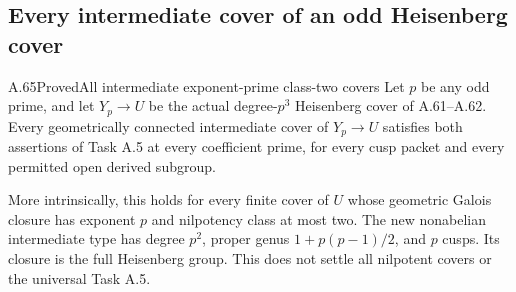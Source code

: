 \subsection{Every intermediate cover of an odd Heisenberg cover}

\begin{statement}{A.65}{Proved}{All intermediate exponent-prime class-two covers}
Let \(p\) be any odd prime, and let
\(Y_p\to U\) be the actual degree-\(p^3\)
Heisenberg cover of A.61--A.62. Every geometrically
connected intermediate cover of \(Y_p\to U\)
satisfies both assertions of Task A.5 at every
coefficient prime, for every cusp packet and every
permitted open derived subgroup.

More intrinsically, this holds for every finite cover
of \(U\) whose geometric Galois closure has exponent
\(p\) and nilpotency class at most two. The new
nonabelian intermediate type has degree \(p^2\),
proper genus \(1+p(p-1)/2\), and \(p\) cusps.
Its closure is the full Heisenberg group. This does
not settle all nilpotent covers or the universal
Task A.5.
\end{statement}

